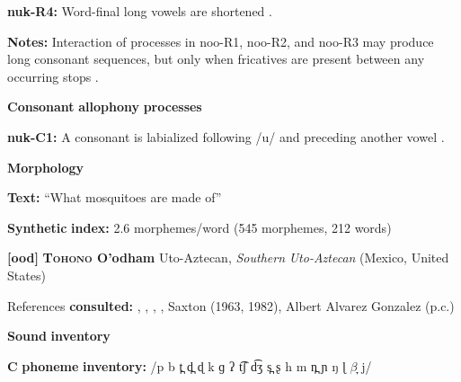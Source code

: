 \begin{styleBody}
\textbf{nuk-R4:} Word-final long vowels are shortened \citep[27]{Rose1981}.
\end{styleBody}

\begin{styleBody}
\textbf{Notes:} Interaction of processes in noo-R1, noo-R2, and noo-R3 may produce long consonant sequences, but only when fricatives are present between any occurring stops \citep[26]{Rose1981}.
\end{styleBody}

\begin{styleBody}
\textbf{Consonant} \textbf{allophony} \textbf{processes}
\end{styleBody}

\begin{styleBody}
\textbf{nuk-C1:} A consonant is labialized following /u/ and preceding another vowel \citep[27]{Stonham1999}.
\end{styleBody}

\begin{styleBody}
\textbf{Morphology}
\end{styleBody}

\begin{styleBody}
\textbf{Text:} “What mosquitoes are made of” \citep[133-143]{Stonham1999}
\end{styleBody}

\begin{styleBody}
\textbf{Synthetic} \textbf{index:} 2.6 morphemes/word (545 morphemes, 212 words)
\end{styleBody}

\begin{styleBody}
\textbf{[ood]}   \textbf{\textsc{Tohono} \textbf{O’odham}}  Uto-Aztecan, \textit{Southern} \textit{Uto-Aztecan} (Mexico, United States)
\end{styleBody}

\begin{styleBody}
References \textbf{consulted:} \citet{DoloresMathiot1991}, \citet{Fitzgerald1994}, \citet{Hale1959}, \citet{HillZepeda1992}, Saxton (1963, 1982), Albert Alvarez Gonzalez (p.c.)
\end{styleBody}

\begin{styleBody}
\textbf{Sound} \textbf{inventory}
\end{styleBody}

\begin{styleBody}
\textbf{C} \textbf{phoneme} \textbf{inventory:} /p b t̪ d̪ ɖ k ɡ ʔ t͡ʃ d͡ʒ s̪ ʂ h m n̪ ɲ ŋ ɭ $\beta ̞$ j/
\end{styleBody}

